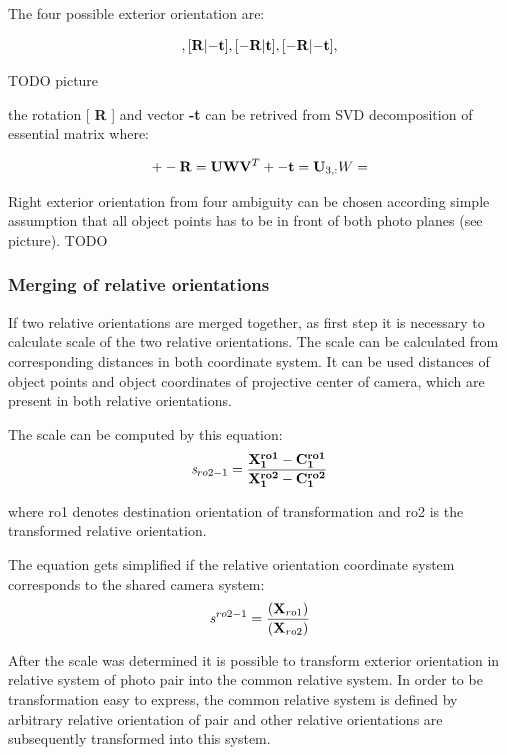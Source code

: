 \documentclass[a4paper,12pt]{report}
\newcommand{\ematr}[1]{
{\bf #1}
}
\newcommand{\evect}[1]{
{\bf #1}
}
\newcommand{\escal}[1]{
{\it #1}
}
\begin{document}
The four possible exterior orientation are:

\begin{equation}
[\ematr{R}|\evect{t}],
[\ematr{R}|\evect{-t}],
[\ematr{-R}|\evect{t}],
[\ematr{-R}|\evect{-t}],
\end{equation}

TODO picture

the rotation [\ematr{R}] and vector \evect{-t} can be retrived from SVD decomposition of essential matrix 
where:

\begin{equation}
+- \ematr{R} = \ematr{U}  \ematr{W} \ematr{V}^{T}
+- \evect{t} = \evect{U}_{3,:}
W = 
\end{equation}


Right exterior orientation from four ambiguity can be chosen according simple assumption that all object points has to be in front
of both photo planes (see picture).
TODO


\subsubsection{Merging of relative orientations}
\label{sec:ess_chain}

If two relative orientations are merged together, as first step it is necessary to calculate scale of the two relative orientations.
The scale can be calculated from corresponding distances in both coordinate system. 
It can be used distances of 
object points and object coordinates of projective center of camera, which are present in both relative orientations.

The scale can be computed by this equation:
\begin{equation}
\escal{s}_{ro2-1} = \frac{\mathbf{\evect{X}^{ro1}_{1} - \evect{C^{ro1}_{1}}}}
	                {\mathbf{\evect{X}^{ro2}_{1} - \evect{C^{ro2}_{1}}}}
\end{equation}

where ro1 denotes destination orientation of transformation and ro2 is the transformed relative orientation. 

The equation gets simplified if the relative orientation coordinate system  corresponds to the shared camera system: 
\begin{equation}
\escal{s}^{ro2-1} = \frac{\mathbf(\evect{X}_{ro1})}
	                 {\mathbf(\evect{X}_{ro2})}
\end{equation}

After the scale was determined it is possible to transform exterior orientation in relative system of photo pair into the common relative system.
In order to be transformation easy to express, the common relative system is defined by arbitrary relative orientation of pair and other 
relative orientations are subsequently transformed into this system. 
\end{document}
